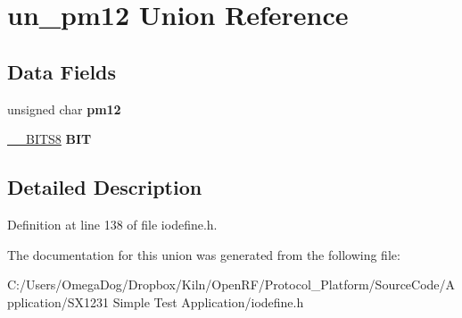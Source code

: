 \hypertarget{unionun__pm12}{\section{un\-\_\-pm12 Union Reference}
\label{unionun__pm12}
}
\subsection*{Data Fields}
\begin{DoxyCompactItemize}
\item 
\hypertarget{unionun__pm12_ac08659038f6b4501d2eb22b26f9137e5}{unsigned char {\bfseries pm12}}\label{unionun__pm12_ac08659038f6b4501d2eb22b26f9137e5}

\item 
\hypertarget{unionun__pm12_a638edfba71f629158fdd804515425d04}{\hyperlink{struct_____b_i_t_s8}{\-\_\-\-\_\-\-B\-I\-T\-S8} {\bfseries B\-I\-T}}\label{unionun__pm12_a638edfba71f629158fdd804515425d04}

\end{DoxyCompactItemize}


\subsection{Detailed Description}


Definition at line 138 of file iodefine.\-h.



The documentation for this union was generated from the following file\-:\begin{DoxyCompactItemize}
\item 
C\-:/\-Users/\-Omega\-Dog/\-Dropbox/\-Kiln/\-Open\-R\-F/\-Protocol\-\_\-\-Platform/\-Source\-Code/\-Application/\-S\-X1231 Simple Test Application/iodefine.\-h\end{DoxyCompactItemize}
